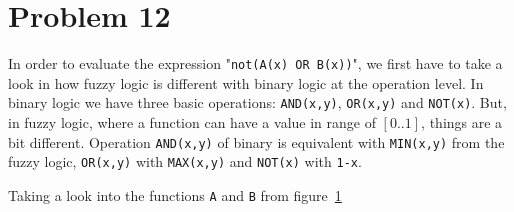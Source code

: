 \section{Problem 12}

In order to evaluate the expression "\verb|not(A(x) OR B(x))|", we first have to take a look in how fuzzy logic is different with binary logic at the operation level.
In binary logic we have three basic operations: \verb*|AND(x,y)|, \verb*|OR(x,y)| and \verb*|NOT(x)|. But, in fuzzy logic, where a function can have a value in range of $\left[0..1\right]$, things are a bit different.
Operation \verb*|AND(x,y)| of binary is equivalent with \verb|MIN(x,y)| from the fuzzy logic, \verb*|OR(x,y)| with \verb*|MAX(x,y)| and \verb*|NOT(x)| with \verb|1-x|.

Taking a look into the functions \verb*|A| and \verb*|B| from figure~\ref{}

\begin{figure}
	\centering
	
\end{figure}